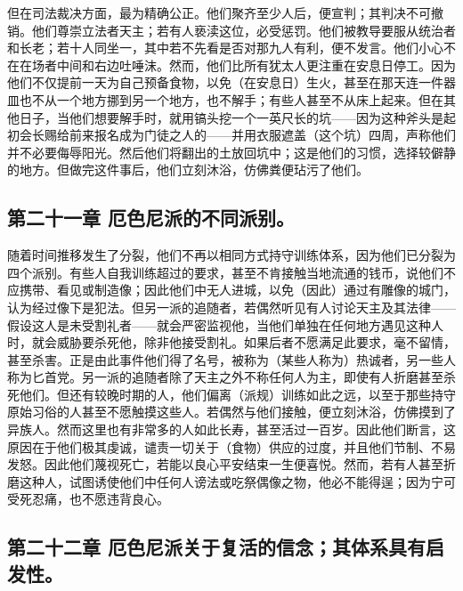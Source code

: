 但在司法裁决方面，最为精确公正。他们聚齐至少人后，便宣判；其判决不可撤销。他们尊崇立法者天主；若有人亵渎这位，必受惩罚。他们被教导要服从统治者和长老；若十人同坐一，其中若不先看是否对那九人有利，便不发言。他们小心不在在场者中间和右边吐唾沫。然而，他们比所有犹太人更注重在安息日停工。因为他们不仅提前一天为自己预备食物，以免（在安息日）生火，甚至在那天连一件器皿也不从一个地方挪到另一个地方，也不解手；有些人甚至不从床上起来。但在其他日子，当他们想要解手时，就用镐头挖一个一英尺长的坑——因为这种斧头是起初会长赐给前来报名成为门徒之人的——并用衣服遮盖（这个坑）四周，声称他们并不必要侮辱阳光。然后他们将翻出的土放回坑中；这是他们的习惯，选择较僻静的地方。但做完这件事后，他们立刻沐浴，仿佛粪便玷污了他们。\par


\subsection{第二十一章 厄色尼派的不同派别。}

随着时间推移发生了分裂，他们不再以相同方式持守训练体系，因为他们已分裂为四个派别。有些人自我训练超过的要求，甚至不肯接触当地流通的钱币，说他们不应携带、看见或制造像；因此他们中无人进城，以免（因此）通过有雕像的城门，认为经过像下是犯法。但另一派的追随者，若偶然听见有人讨论天主及其法律——假设这人是未受割礼者——就会严密监视他，当他们单独在任何地方遇见这种人时，就会威胁要杀死他，除非他接受割礼。如果后者不愿满足此要求，毫不留情，甚至杀害。正是由此事件他们得了名号，被称为（某些人称为）热诚者，另一些人称为匕首党。另一派的追随者除了天主之外不称任何人为主，即使有人折磨甚至杀死他们。但还有较晚时期的人，他们偏离（派规）训练如此之远，以至于那些持守原始习俗的人甚至不愿触摸这些人。若偶然与他们接触，便立刻沐浴，仿佛摸到了异族人。然而这里也有非常多的人如此长寿，甚至活过一百岁。因此他们断言，这原因在于他们极其虔诚，谴责一切关于（食物）供应的过度，并且他们节制、不易发怒。因此他们蔑视死亡，若能以良心平安结束一生便喜悦。然而，若有人甚至折磨这种人，试图诱使他们中任何人谤法或吃祭偶像之物，他必不能得逞；因为宁可受死忍痛，也不愿违背良心。\par


\subsection{第二十二章 厄色尼派关于复活的信念；其体系具有启发性。}

